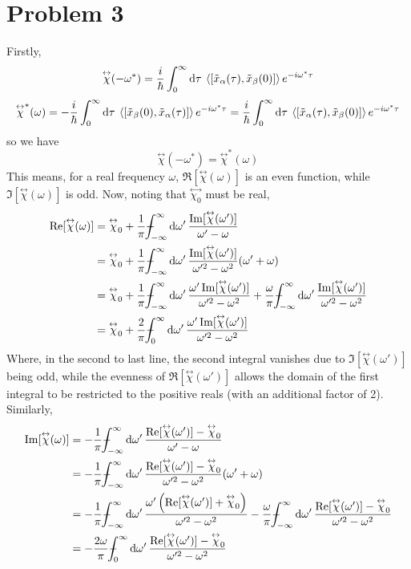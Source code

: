 \documentclass[12pt]{article}
\newcommand{\cint}[2]{\int_{#1}^{#2}}
\newcommand{\cintd}[3]{\cint{#1}{#2}\dd#3\:}
\newcommand{\tens}[1]{\overset{\leftrightarrow}{#1}}
\def\Xint#1{\mathchoice
   {\XXint\displaystyle\textstyle{#1}}%
   {\XXint\textstyle\scriptstyle{#1}}%
   {\XXint\scriptstyle\scriptscriptstyle{#1}}%
   {\XXint\scriptscriptstyle\scriptscriptstyle{#1}}%
   \!\int}
\def\XXint#1#2#3{{\setbox0=\hbox{$#1{#2#3}{\int}$}
     \vcenter{\hbox{$#2#3$}}\kern-.5\wd0}}
\def\dashint{\Xint-}
\newcommand{\fulldashintd}[1]{\dashint_{-\infty}^{\infty}\dd{#1}}
\begin{document}
\section*{Problem 3}
Firstly,
\[ \tens{\chi}(-\omega^*) = \frac{i}{\hbar}\cintd{0}{\infty}{\tau}\ev{\comm{\tilde{x}_\alpha(\tau)}{\tilde{x}_\beta(0)}}e^{-i\omega^*\tau} \]
\[ \tens{\chi}^*(\omega) = -\frac{i}{\hbar}\cintd{0}{\infty}{\tau}\ev{\comm{\tilde{x}_\beta(0)}{\tilde{x}_\alpha(\tau)}}e^{-i\omega^*\tau} = \frac{i}{\hbar}\cintd{0}{\infty}{\tau}\ev{\comm{\tilde{x}_\alpha(\tau)}{\tilde{x}_\beta(0)}}e^{-i\omega^*\tau} \]
so we have 
\[  \tens{\chi}(-\omega^*) = \tens{\chi}^*(\omega) \]
This means, for a real frequency $\omega$, $\Re[\tens{\chi}(\omega)]$ is an even function, while $\Im[\tens{\chi}(\omega)]$ is odd. Now, noting that $\tens{\chi_0}$ must be real,
\begin{align*}
    \Re[\tens{\chi}(\omega)] &= \tens{\chi}_0 + \frac{1}{\pi}\fulldashintd{\omega'}\frac{\Im[\tens{\chi}(\omega')]}{\omega' - \omega} \\
    &= \tens{\chi}_0 + \frac{1}{\pi}\fulldashintd{\omega'}\frac{\Im[\tens{\chi}(\omega')]}{\omega'^2 - \omega^2}(\omega' + \omega) \\
    &= \tens{\chi}_0 + \frac{1}{\pi}\fulldashintd{\omega'}\frac{\omega'\Im[\tens{\chi}(\omega')]}{\omega'^2 - \omega^2} + \frac{\omega}{\pi}\fulldashintd{\omega'}\frac{\Im[\tens{\chi}(\omega')]}{\omega'^2-\omega^2} \\
    &= \tens{\chi}_0 + \frac{2}{\pi}\dashint_0^\infty\dd{\omega'}\frac{\omega'\Im[\tens{\chi}(\omega')]}{\omega'^2 - \omega^2}
\end{align*}
Where, in the second to last line, the second integral vanishes due to $\Im[\tens{\chi}(\omega')]$ being odd, while the evenness of $\Re[\tens{\chi}(\omega')]$ allows the domain of the first integral to be restricted to the positive reals (with an additional factor of 2). \\
Similarly,
\begin{align*}
    \Im[\tens{\chi}(\omega)] &= -\frac{1}{\pi}\fulldashintd{\omega'}\frac{\Re[\tens{\chi}(\omega')] - \tens{\chi}_0}{\omega' - \omega} \\
    &= -\frac{1}{\pi}\fulldashintd{\omega'}\frac{\Re[\tens{\chi}(\omega')] - \tens{\chi}_0}{\omega'^2 - \omega^2}(\omega' + \omega) \\
    &= -\frac{1}{\pi}\fulldashintd{\omega'}\frac{\omega'\left(\Re[\tens{\chi}(\omega')] + \tens{\chi}_0\right)}{\omega'^2 - \omega^2} - \frac{\omega}{\pi}\fulldashintd{\omega'}\frac{\Re[\tens{\chi}(\omega')] - \tens{\chi}_0}{\omega'^2 - \omega^2} \\
    &= -\frac{2\omega}{\pi}\dashint_0^\infty\dd{\omega'}\frac{\Re[\tens{\chi}(\omega')] - \tens{\chi}_0}{\omega'^2 - \omega^2} 
\end{align*}
\end{document}
